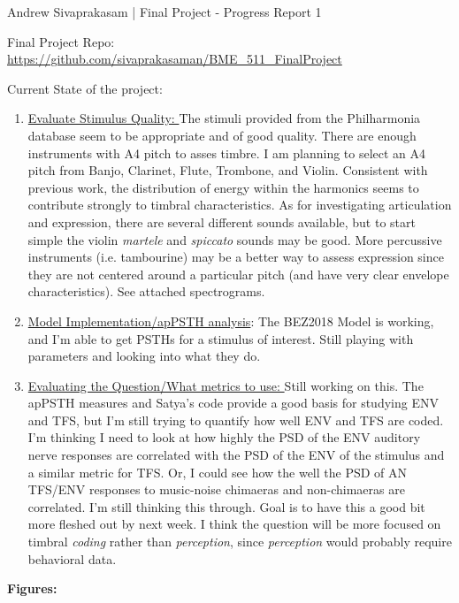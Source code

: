 \documentclass[9pt]{extarticle}
\begin{document}
{\huge Andrew Sivaprakasam | Final Project - Progress Report 1}
\begin{center}
Final Project Repo: \url{https://github.com/sivaprakasaman/BME_511_FinalProject} 
\end{center}

Current State of the project:

\begin{enumerate}
\item \underline{Evaluate Stimulus Quality: } The stimuli provided from the Philharmonia database seem to be appropriate and of good quality. There are enough instruments with A4 pitch to asses timbre. I am planning to select an A4 pitch from Banjo, Clarinet, Flute, Trombone, and Violin. Consistent with previous work, the distribution of energy within the harmonics seems to contribute strongly to timbral characteristics. As for investigating articulation and expression, there are several different sounds available, but to start simple the violin \textit{martele} and \textit{spiccato} sounds may be good. More percussive instruments (i.e. tambourine) may be a better way to assess expression since they are not centered around a particular pitch (and have very clear envelope characteristics). See attached spectrograms.

\item \underline{Model Implementation/apPSTH analysis}: The BEZ2018 Model is working, and I'm able to get PSTHs for a stimulus of interest. Still playing with parameters and looking into what they do. 

\item \underline{Evaluating the Question/What metrics to use: } Still working on this. The apPSTH measures and Satya's code provide a good basis for studying ENV and TFS, but I'm still trying to quantify how well ENV and TFS are coded. I'm thinking I need to look at how highly the PSD of the ENV auditory nerve responses are correlated with the PSD of the ENV of the stimulus and  a similar metric for TFS. Or, I could see how the well the PSD of AN TFS/ENV responses to music-noise chimaeras and non-chimaeras are correlated. I'm still thinking this through. Goal is to have this a good bit more fleshed out by next week. I think the question will be more focused on timbral \textit{coding} rather than \textit{perception}, since \textit{perception} would probably require behavioral data.
\end{enumerate}

\textbf{Figures:}\\
\end{document}
